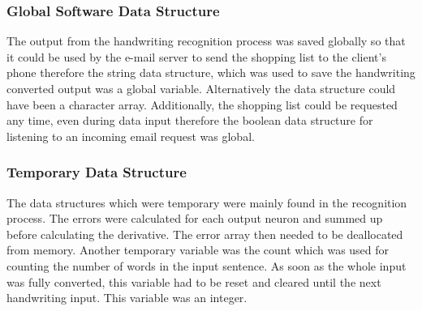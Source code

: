 \subsubsection{Global Software Data Structure}
The output from the handwriting recognition process was saved globally so that it could be used by the e-mail server to send the shopping list to the client's phone therefore the string data structure, which was used to save the handwriting converted output was a global variable. Alternatively the data structure could have been a character array. Additionally, the shopping list could be requested any time, even during data input therefore the boolean data structure for listening to an incoming email request was global. 
\subsubsection{Temporary Data Structure}
The data structures which were temporary were mainly found in the recognition process. The errors were calculated for each output neuron and summed up before calculating the derivative. The error array then needed to be deallocated from memory. Another temporary variable was the count which was used for counting the number of words in the input sentence. As soon as the whole input was fully converted, this variable had to be reset and cleared until the next handwriting input. This variable was an integer.

